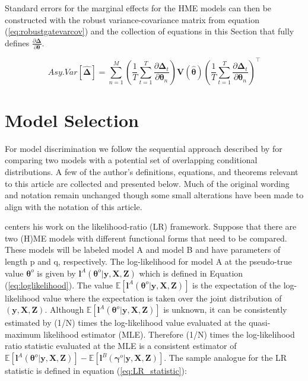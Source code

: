 \documentclass[12pt]{article}
\theoremstyle{definition}
\begin{document}
Standard errors for the marginal effects for the HME models can then be
constructed with the robust variance-covariance matrix from equation
(\ref{eq:robustgatevarcov}) and the collection of equations in this Section
that fully defines $\frac{\partial \boldsymbol{\Delta}}{\partial \boldsymbol{\theta}}$.


\begin{equation} \label{eq:std_errs_full_marginal_effects}
  Asy.Var \left[ \boldsymbol{ \hat{ \Delta } } \right] = \sum^{M}_{n=1}  \left( \frac{1}{T} \sum^{T}_{t=1} \frac{\partial \boldsymbol{\Delta}_{t}}{\partial \boldsymbol{\theta}_{n}} \right)     \boldsymbol{V}(\boldsymbol{\hat{\theta}})      \left( \frac{1}{T} \sum^{T}_{t=1} \frac{\partial \boldsymbol{\Delta}_{t}}{\partial \boldsymbol{\theta}_{n}} \right)^\top
\end{equation} 


\section{Model Selection} \label{sec:ModelSelection}

For model discrimination we follow the sequential approach described 
by \citet{Voung1989} for comparing two models with a potential set of overlapping
conditional distributions. A few of the author's definitions, equations, and theorems relevant 
to this article are collected and presented below. Much of the original wording
and notation remain unchanged though some small alterations have been made to align with the
notation of this article. 

\bigskip

\citet{Voung1989} centers his work on the likelihood-ratio (LR) framework.
Suppose that there are two (H)ME models with different functional forms that need
to be compared. These models will be labeled model A and model B and have parameters
of length p and q, respectively. The log-likelihood
for model A at the pseudo-true value $\boldsymbol{\theta}^{o}$ is given by
$\boldsymbol{l}^{A}(\boldsymbol{\theta}^{o}| \boldsymbol{y}, \boldsymbol{X}, \boldsymbol{Z})$
which is defined in Equation (\ref{eq:loglikelihood}). The value
$\mathbb{E} \left[ \boldsymbol{l}^{A}(\boldsymbol{\theta}^{o}| \boldsymbol{y}, \boldsymbol{X}, \boldsymbol{Z}) \right]$
is the expectation of the log-likelihood value where the expectation is taken over the
joint distribution of $(\boldsymbol{y}, \boldsymbol{X}, \boldsymbol{Z})$. Although
$\mathbb{E} \left[ \boldsymbol{l}^{A}(\boldsymbol{\theta}^{o}| \boldsymbol{y}, \boldsymbol{X}, \boldsymbol{Z}) \right]$
is unknown, it can be consistently estimated by (1/N) times the log-likelihood
value evaluated at the quasi-maximum likelihood estimator (MLE). Therefore (1/N) times
the log-likelihood ratio statistic evaluated at the MLE is a consistent estimator of 
$\mathbb{E} \left[ \boldsymbol{l}^{A}(\boldsymbol{\theta}^{o}| \boldsymbol{y}, \boldsymbol{X}, \boldsymbol{Z}) \right] - \mathbb{E} \left[ \boldsymbol{l}^{B}(\boldsymbol{\gamma}^{o}| \boldsymbol{y}, \boldsymbol{X}, \boldsymbol{Z}) \right]$.
The sample analogue for the LR statistic is defined in equation (\ref{eq:LR_statistic}):
\end{document}
